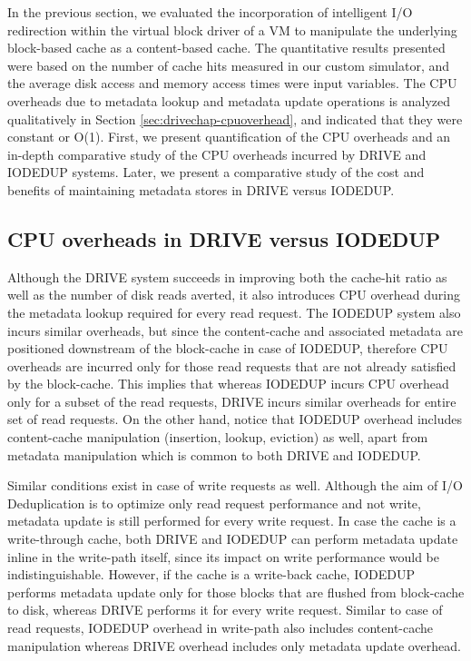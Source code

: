 
In the previous section, we evaluated the incorporation of
intelligent I/O redirection within the virtual block driver of a VM
to manipulate the underlying block-based cache as a content-based cache.
The quantitative results presented were based on the number of cache hits 
measured in our custom simulator, and the average disk access and memory 
access times were input variables. The CPU overheads due to metadata 
lookup and metadata update operations is analyzed qualitatively in 
Section \ref{sec:drivechap-cpuoverhead}, and indicated that they were 
constant or O(1). 
First, we present quantification of the CPU overheads and an
in-depth comparative study of the CPU overheads incurred by DRIVE and
IODEDUP systems. Later, we present a comparative study of the cost
and benefits of maintaining metadata stores in DRIVE versus IODEDUP.

\subsection{CPU overheads in DRIVE versus IODEDUP}
Although the DRIVE system succeeds in improving both the cache-hit ratio
as well as the number of disk reads averted, it also introduces CPU overhead
during the metadata lookup required for every read request. The IODEDUP system
also incurs similar overheads, but since the content-cache and associated
metadata are positioned downstream of the block-cache in case of IODEDUP,
therefore CPU overheads are incurred only for those read requests that are not
already satisfied by the block-cache. This implies that whereas IODEDUP
incurs CPU overhead only for a subset of the read requests, DRIVE incurs
similar overheads for entire set of read requests.
On the other hand, notice that IODEDUP overhead includes content-cache
manipulation (insertion, lookup, eviction) as well, apart from metadata
manipulation which is common to both DRIVE and IODEDUP.

Similar conditions exist in case of write requests as well. Although the
aim of I/O Deduplication is to optimize only read request performance and
not write, metadata update is still performed for every write request. In
case the cache is a write-through cache, both DRIVE and IODEDUP can
perform metadata update inline in the write-path itself, since its impact
on write performance would be indistinguishable. However, if the cache is
a write-back cache, IODEDUP performs metadata update only for those blocks
that are flushed from block-cache to disk, whereas DRIVE performs it
for every write request. Similar to case of read requests, IODEDUP overhead
in write-path also includes content-cache manipulation whereas DRIVE
overhead includes only metadata update overhead.

